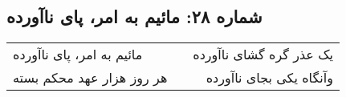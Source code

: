 \begin{center}
\section*{شماره ۲۸: مائیم به امر، پای ناآورده}
\label{sec:028}
\begin{longtable}{l p{0.5cm} r}
مائیم به امر، پای ناآورده
&&
یک عذر گره گشای ناآورده
\\
هر روز هزار عهد محکم بسته
&&
وآنگاه یکی بجای ناآورده
\\
\end{longtable}
\end{center}
